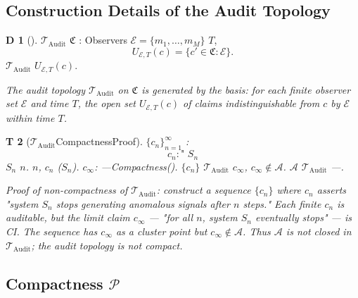 \documentclass[12pt,a4paper]{article}
\theoremstyle{plain}
\newtheorem{theorem}Theorem[section]
\theoremstyle{definition}
\newtheorem{definition}[theorem]Definition
\theoremstyle{remark}
\newcommand{\T}{\mathcal{T}}
\newcommand{\A}{\mathcal{A}}
\newcommand{\ClaimSpace}{\mathfrak{C}}
\DeclareMathOperator{\Audit}{Audit}
\begin{document}
\subsection{Construction Details of the Audit Topology}
\begin{definition}[]\label{def:audit_topology_detail}
 $\T_{\Audit}$ $\ClaimSpace$ : Observers $\mathcal{E} = \{m_1, \dots, m_M\}$ $T$, 
\begin{equation}
 U_{\mathcal{E}, T}(c) = \{c' \in \ClaimSpace : \mathcal{E} \text{}\}.
\end{equation}
 $\T_{\Audit}$ $U_{\mathcal{E}, T}(c)$.
\end{definition}
\vspace{4pt}
\noindent
\textit{The audit topology $\T_{\Audit}$ on $\ClaimSpace$ is generated by the basis: for each finite observer set $\mathcal{E}$ and time $T$, the open set $U_{\mathcal{E}, T}(c)$ of claims indistinguishable from $c$ by $\mathcal{E}$ within time $T$.}
\begin{theorem}[$\T_{\Audit}$CompactnessProof]\label{thm:noncompact_proof}
 $\{c_n\}_{n=1}^{\infty}$ : 
\begin{equation}
 c_n: \text{" $S_n$}
\end{equation}
 $S_n$ $n$. $n$, $c_n$ ($S_n$). $c_{\infty}$: ---Compactness(). $\{c_n\}$ $\T_{\Audit}$ $c_{\infty}$, $c_{\infty} \notin \A$. $\A$ $\T_{\Audit}$ ---.
\end{theorem}
\vspace{4pt}
\noindent
\textit{Proof of non-compactness of $\T_{\Audit}$: construct a sequence $\{c_n\}$ where $c_n$ asserts "system $S_n$ stops generating anomalous signals after $n$ steps." Each finite $c_n$ is auditable, but the limit claim $c_{\infty}$ --- "for all $n$, system $S_n$ eventually stops" --- is CI. The sequence has $c_{\infty}$ as a cluster point but $c_{\infty} \notin \A$. Thus $\A$ is not closed in $\T_{\Audit}$; the audit topology is not compact.}
\subsection{Compactness $\mathcal{P}$}
\end{document}
